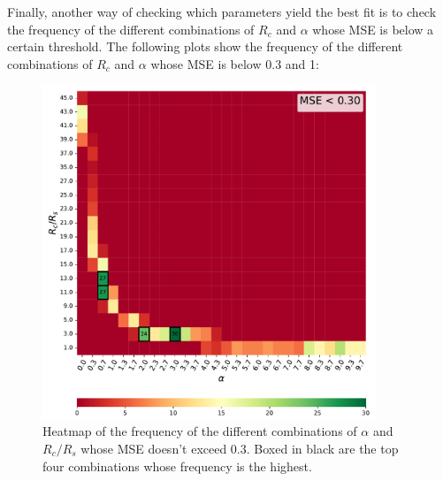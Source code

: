 Finally, another way of checking which parameters yield the best fit is to check the frequency of the different combinations of $R_c$ and $\alpha$ whose MSE is below a certain threshold. The following plots show the frequency of the different combinations of $R_c$ and $\alpha$ whose MSE is below 0.3 and 1:

\begin{figure}[H]
    \includegraphics[width=0.89\textwidth]{Figures/Frequencymse0.30.pdf}
    \centering
    \caption{Heatmap of the frequency of the different combinations of $\alpha$ and $R_c/R_s$ whose MSE doesn't exceed 0.3. Boxed in black are the top four combinations whose frequency is the highest.}
    \label{fig:frequencymse0.3}
\end{figure}
